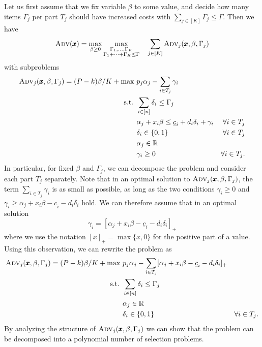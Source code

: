 Let us first assume that we fix variable $\beta$ to some value, and decide how many items $\Gamma_j$ per part $T_j$ should have increased costs with $\sum_{j\in[K]} \Gamma_j \le \Gamma$. Then we have
\[ \textsc{Adv}(\pmb{x}) = \max_{{\beta \ge 0}} \max_{\substack{\Gamma_1,\ldots,\Gamma_K\\ \Gamma_1 + \dots + \Gamma_K \leq \Gamma}} \quad \sum_{j\in[K]} \textsc{Adv}_j(\pmb{x},\beta,\Gamma_j) \]
with subproblems
\begin{align*}
\textsc{Adv}_j(\pmb{x},\beta,\Gamma_j) = (P-k)\beta\lasse{/K} + \max\ &  p_j \alpha_j - \sum_{i\in T_j} \gamma_i \\
\text{s.t. } & \sum_{i\in[n]} \delta_i \le \Gamma_j \\
& \alpha_j + x_i \beta \le \underline{c}_i + d_i\delta_i + \gamma_i & \forall i\in T_j \\
& \delta_i\in\{0,1\} & \forall i\in T_j \\
& \alpha_j \in \rr \\
& \gamma_i \ge 0 & \forall i\in T_j.
\end{align*}
In particular, for fixed $\beta$ and $\Gamma_j$, we can decompose the problem and consider each part $T_j$ separately. Note that in an optimal solution to $\textsc{Adv}_j(\pmb{x},\beta,\Gamma_j)$, the term $\sum_{i\in T_j} \gamma_i$ is as small as possible, as long as the two conditions $\gamma_i \geq 0$ and $\gamma_i \geq \alpha_j + x_i \beta - \underline{c}_i - d_i\delta_i$ hold. We can therefore assume that in an optimal solution
\[ \gamma_i = [\alpha_j + x_i \beta - \underline{c}_i - d_i\delta_i ]_+ \]
where we use the notation $[x]_+ = \max\{x,0\}$ for the positive part of a value. Using this observation, we can rewrite the problem as 
\begin{subequations}
\label{eq:a}  
\begin{align}
\textsc{Adv}_j(\pmb{x},\beta,\Gamma_j) = (P-k)\beta \lasse{/K} + \max\ &  p_j \alpha_j - \sum_{i\in T_j} [\alpha_j + x_i \beta - \underline{c}_i - d_i\delta_i]_+ \label{a-0} \\
\text{s.t. } & \sum_{i\in[n]} \delta_i \le \Gamma_j \label{a-1}\\
& \alpha_j \in \rr \\
& \delta_i\in\{0,1\} & \forall i\in T_j. \label{a-2}
\end{align}
\end{subequations}
By analyzing the structure of $\textsc{Adv}_j(\pmb{x},\beta,\Gamma_j)$ we can show 
that the problem can be decomposed into a polynomial number of selection problems. 
